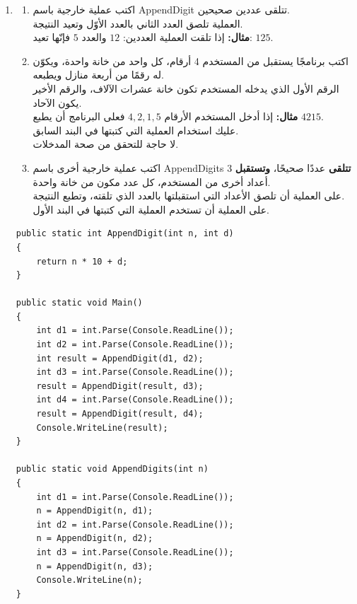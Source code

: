 ﻿\documentclass[14pt]{extarticle}
\begin{document}
\begin{enumerate}[itemsep=3em]
\begin{enumerate}
\clearpage
\item
\begin{enumerate}
    \item اكتب عملية خارجية باسم \textenglish{AppendDigit} تتلقى عددين صحيحين. \\
    العملية تلصق العدد الثاني بالعدد الأوّل وتعيد النتيجة. \\
    \textbf{مثال:} إذا تلقت العملية العددين: $12$ والعدد $5$ فإنّها تعيد: $125$.
    \item اكتب برنامجًا يستقبل من المستخدم 4 أرقام، كل واحد من خانة واحدة، ويكوّن له رقمًا من أربعة منازل ويطبعه. \\
    الرقم الأول الذي يدخله المستخدم تكون خانة عشرات الآلاف، والرقم الأخير يكون الآحاد. \\
    \textbf{مثال:} إذا أدخل المستخدم الأرقام $4,2,1,5$ فعلى البرنامج أن يطبع $4215$. \\
    عليك استخدام العملية التي كتبتها في البند السابق. \\
    لا حاجة للتحقق من صحة المدخلات.
    \item اكتب عملية خارجية أخرى باسم \textenglish{AppendDigits} \textbf{تتلقى} عددًا صحيحًا، \textbf{وتستقبل} 3 أعداد أخرى من المستخدم، كل عدد مكون من خانة واحدة. \\
    على العملية أن تلصق الأعداد التي استقبلتها بالعدد الذي تلقته، وتطبع النتيجة. \\
    على العملية أن تستخدم العملية التي كتبتها في البند الأول.
\end{enumerate}
    \ifwithsols
\begin{boxSolution}
\begin{english}
\begin{verbatim}
public static int AppendDigit(int n, int d)
{
    return n * 10 + d;
}

public static void Main()
{
    int d1 = int.Parse(Console.ReadLine());
    int d2 = int.Parse(Console.ReadLine());
    int result = AppendDigit(d1, d2);
    int d3 = int.Parse(Console.ReadLine());
    result = AppendDigit(result, d3);
    int d4 = int.Parse(Console.ReadLine());
    result = AppendDigit(result, d4);
    Console.WriteLine(result);
}

public static void AppendDigits(int n)
{
    int d1 = int.Parse(Console.ReadLine());
    n = AppendDigit(n, d1);
    int d2 = int.Parse(Console.ReadLine());
    n = AppendDigit(n, d2);
    int d3 = int.Parse(Console.ReadLine());
    n = AppendDigit(n, d3);
    Console.WriteLine(n);
}
\end{verbatim}
\end{english}
\end{boxSolution}
\fi



\end{enumerate}
\end{enumerate}
\end{document}
